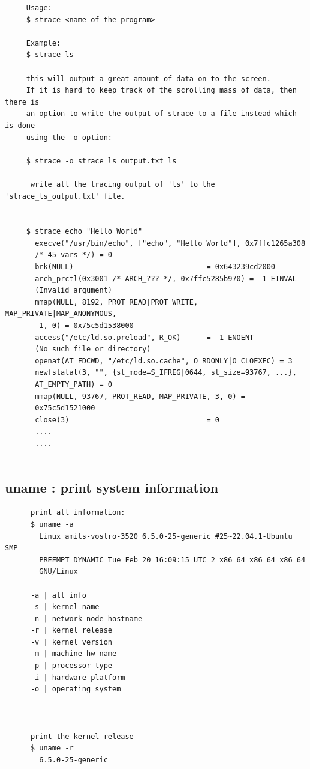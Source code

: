 \documentclass[a4paper,12pt]{article}
\begin{document}
\begin{verbatim}
     Usage: 
     $ strace <name of the program>
     
     Example:
     $ strace ls

     this will output a great amount of data on to the screen. 
     If it is hard to keep track of the scrolling mass of data, then there is 
     an option to write the output of strace to a file instead which is done 
     using the -o option:
     
     $ strace -o strace_ls_output.txt ls

      write all the tracing output of 'ls' to the 'strace_ls_output.txt' file.


     $ strace echo "Hello World"
       execve("/usr/bin/echo", ["echo", "Hello World"], 0x7ffc1265a308 
       /* 45 vars */) = 0
       brk(NULL)                               = 0x643239cd2000
       arch_prctl(0x3001 /* ARCH_??? */, 0x7ffc5285b970) = -1 EINVAL 
       (Invalid argument)
       mmap(NULL, 8192, PROT_READ|PROT_WRITE, MAP_PRIVATE|MAP_ANONYMOUS, 
       -1, 0) = 0x75c5d1538000
       access("/etc/ld.so.preload", R_OK)      = -1 ENOENT 
       (No such file or directory)
       openat(AT_FDCWD, "/etc/ld.so.cache", O_RDONLY|O_CLOEXEC) = 3
       newfstatat(3, "", {st_mode=S_IFREG|0644, st_size=93767, ...},    
       AT_EMPTY_PATH) = 0
       mmap(NULL, 93767, PROT_READ, MAP_PRIVATE, 3, 0) = 
       0x75c5d1521000
       close(3)                                = 0
       ....
       ....
     

\end{verbatim}

\subsection{uname : print system information }
\begin{verbatim}
      print all information:
      $ uname -a
        Linux amits-vostro-3520 6.5.0-25-generic #25~22.04.1-Ubuntu SMP 
        PREEMPT_DYNAMIC Tue Feb 20 16:09:15 UTC 2 x86_64 x86_64 x86_64 
        GNU/Linux
      
      -a | all info
      -s | kernel name
      -n | network node hostname
      -r | kernel release
      -v | kernel version
      -m | machine hw name
      -p | processor type
      -i | hardware platform
      -o | operating system
      
      
      
      print the kernel release  
      $ uname -r
        6.5.0-25-generic
    
    
\end{verbatim}
\end{document}
